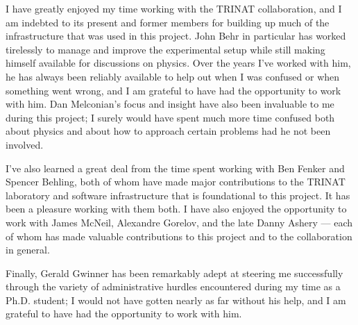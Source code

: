 

\clearpage
\begin{acknowledgement}
I have greatly enjoyed my time working with the TRINAT collaboration, and I am indebted to its present and former members for building up much of the infrastructure that was used in this project.  John Behr in particular has worked tirelessly to manage and improve the experimental setup while still making himself available for discussions on physics.  Over the years I've worked with him, he has always been reliably available to help out when I was confused or when something went wrong, and I am grateful to have had the opportunity to work with him.  Dan Melconian's focus and insight have also been invaluable to me during this project; I surely would have spent much more time confused both about physics and about how to approach certain problems had he not been involved.  

I've also learned a great deal from the time spent working with Ben Fenker and Spencer Behling, both of whom have made major contributions to the TRINAT laboratory and software infrastructure that is foundational to this project.  It has been a pleasure working with them both.  I have also enjoyed the opportunity to work with James McNeil, Alexandre Gorelov, and the late Danny Ashery --- each of whom has made valuable contributions to this project and to the collaboration in general.  

Finally, Gerald Gwinner has been remarkably adept at steering me successfully through the variety of administrative hurdles encountered during my time as a Ph.D. student; I would not have gotten nearly as far without his help, and I am grateful to have had the opportunity to work with him.  

%
\end{acknowledgement}
